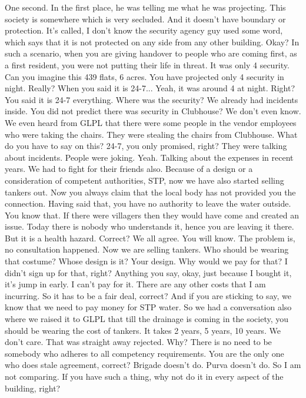 One second.
In the first place, he was telling me what he was projecting.
This society is somewhere which is very secluded.
And it doesn't have boundary or protection.
It's called, I don't know the security agency guy used some word,
which says that it is not protected on any side from any other building.
Okay?
In such a scenario, when you are giving handover to people who are coming first,
as a first resident, you were not putting their life in threat.
It was only 4 security.
Can you imagine this 439 flats, 6 acres.
You have projected only 4 security in night.
Really?
When you said it is 24-7...
Yeah, it was around 4 at night.
Right?
You said it is 24-7 everything.
Where was the security?
We already had incidents inside.
You did not predict there was security in Clubhouse?
We don't even know.
We even heard from GLPL that there were some people in the vendor employees
who were taking the chairs.
They were stealing the chairs from Clubhouse.
What do you have to say on this?
24-7, you only promised, right?
They were talking about incidents.
People were joking.
Yeah.
Talking about the expenses in recent years.
We had to fight for their friends also.
Because of a design or a consideration of competent authorities, STP,
now we have also started selling tankers out.
Now you always claim that the local body has not provided you the connection.
Having said that, you have no authority to leave the water outside.
You know that.
If there were villagers then they would have come and created an issue.
Today there is nobody who understands it, hence you are leaving it there.
But it is a health hazard.
Correct?
We all agree.
You will know.
The problem is, no consultation happened.
Now we are selling tankers.
Who should be wearing that costume?
Whose design is it?
Your design.
Why would we pay for that?
I didn't sign up for that, right?
Anything you say, okay, just because I bought it, it's jump in early.
I can't pay for it.
There are any other costs that I am incurring.
So it has to be a fair deal, correct?
And if you are sticking to say, we know that we need to pay money for STP water.
So we had a conversation also where we raised it to GLPL
that till the drainage is coming in the society,
you should be wearing the cost of tankers.
It takes 2 years, 5 years, 10 years.
We don't care.
That was straight away rejected.
Why?
There is no need to be somebody who adheres to all competency requirements.
You are the only one who does stale agreement, correct?
Brigade doesn't do.
Purva doesn't do.
So I am not comparing.
If you have such a thing, why not do it in every aspect of the building, right?
